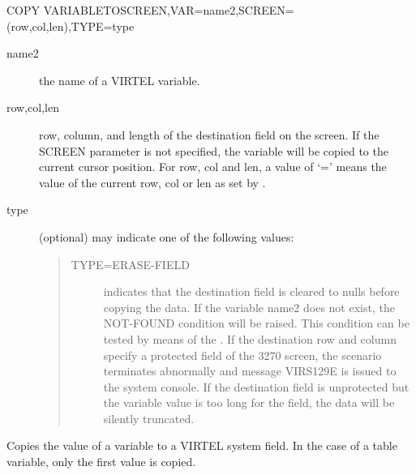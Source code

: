 \documentclass[letterpaper,10pt,english]{sphinxmanual}
\begin{document}
\begin{sphinxVerbatim}[commandchars=\\\{\}]
COPY\PYGZdl{} VARIABLE\PYGZhy{}TO\PYGZhy{}SCREEN,VAR=\PYGZsq{}name2\PYGZsq{},SCREEN=(row,col,len),TYPE=type
\end{sphinxVerbatim}
\begin{description}
\item[{name2}] \leavevmode
the name of a VIRTEL variable.

\item[{row,col,len}] \leavevmode
row, column, and length of the destination field on the screen. If the SCREEN parameter is not specified, the variable will be copied to the current cursor position. For row, col and len, a value of ‘=’ means the value of the current row, col or len as set by {\hyperref[\detokenize{User_Guide:v457ug-set-screen-position}]{}}.

\item[{type}] \leavevmode
(optional) may indicate one of the following values:
\begin{quote}
\begin{description}
\item[{TYPE=ERASE-FIELD}] \leavevmode
indicates that the destination field is cleared to nulls before copying the data. If the variable name2 does not exist, the NOT-FOUND condition will be raised. This condition can be tested by means of the {\hyperref[\detokenize{User_Guide:v457ug-if}]{}}. If the destination row and column specify a protected field of the 3270 screen, the scenario terminates abnormally and message VIRS129E is issued to the system console. If the destination field is unprotected but the variable value is too long for the field, the data will be silently truncated.

\end{description}
\end{quote}

\end{description}


Copies the value of a variable to a VIRTEL system field. In the case of a table variable, only the first value is copied.
\end{document}
